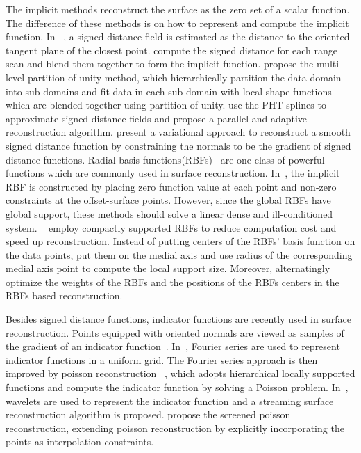 \documentclass[review]{acmsiggraph}
\begin{document}
The implicit methods reconstruct the surface as the zero set of a scalar function. 
The difference of these methods is on how to represent and compute the implicit function.
In ~\cite{Hoppe-etal-1992}, a signed distance field is estimated as the distance to the oriented
tangent plane of the closest point. \cite{Curless-Levoy-1996} compute the signed distance for each range
scan and blend them together to form the implicit function. \cite{Ohtake-etal-2003} propose the multi-level
partition of unity method, which hierarchically partition the data domain into sub-domains and fit data in
each sub-domain with local shape functions which are blended together using partition of unity. 
\cite{Wang-etal-2011} use the PHT-splines to approximate signed distance fields and propose a parallel and 
adaptive reconstruction algorithm.\cite{Calakli-etal-2011} present a variational approach to reconstruct a smooth signed
distance function by constraining the normals to be the gradient of signed distance functions.
Radial basis functions(RBFs)~\cite{Savchenko-etal-1995} are one class of powerful functions which are commonly used in surface reconstruction.
In~\cite{Turk-O'Brien-1999,Carr-etal-2001,Dinh-etal-2002,Turk-OBrien-2002}, the implicit RBF is constructed by placing zero function value
at each point and non-zero constraints at the offset-surface points. However, since the global RBFs have global support, 
these methods should solve a linear dense and ill-conditioned system. ~\cite{Morse-etal-2001,Kojekine-etal-2003,Ohtake-etal-2003b} employ 
compactly supported RBFs to reduce computation cost and speed up reconstruction. Instead of putting centers of the RBFs'
basis function on the data points, \cite{Samozino-etal-2006} put them on the medial axis and use radius of the corresponding medial axis point
to compute the local support size. Moreover, \cite{Submuth-etal-2010} alternatingly optimize the weights of the RBFs and the positions of the RBFs centers in the RBFs based reconstruction.

Besides signed distance functions, indicator functions are recently used in surface reconstruction. Points equipped with oriented
normals are viewed as samples of the gradient of an indicator function~\cite{Kazhdan-etal-2005,Kazhdan-etal-2006,Manson-etal-2008,Kazhdan-etal-2013}.
In~\cite{Kazhdan-etal-2005}, Fourier series are used to represent indicator functions in a uniform grid. 
The Fourier series approach is then improved by poisson reconstruction ~\cite{Kazhdan-etal-2006}, which adopts hierarchical locally supported 
functions and compute the indicator function by solving a Poisson problem. In~\cite{Manson-etal-2008}, wavelets are used
to represent the indicator function and a streaming surface reconstruction algorithm is proposed. \cite{Kazhdan-etal-2013} propose the
screened poisson reconstruction, extending poisson reconstruction by explicitly incorporating the points as interpolation constraints.
\end{document}
